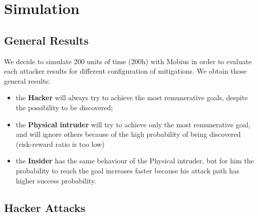 %
\chapter{Simulation}\label{ch:simulation}
\section{General Results}
We decide to simulate 200 units of time (200h) with Mobius in order to evaluate each attacker results for 
different configuration of mitigations. We obtain those general results:\\
\begin{itemize}
    \item the \textbf{Hacker} will always try to achieve the most remunerative goals, despite the
        possibility to be discovered; 
    \item the \textbf{Physical intruder} will try to achieve only the most remunerative goal, and will
        ignore others because of the high probability of being discovered (risk-reward ratio is too low)
    \item the \textbf{Insider} has the same behaviour of the Physical intruder, but for him the probability
        to reach the goal increases faster because his attack path has higher success probability.
\end{itemize}
\newpage
\section{Hacker Attacks}
